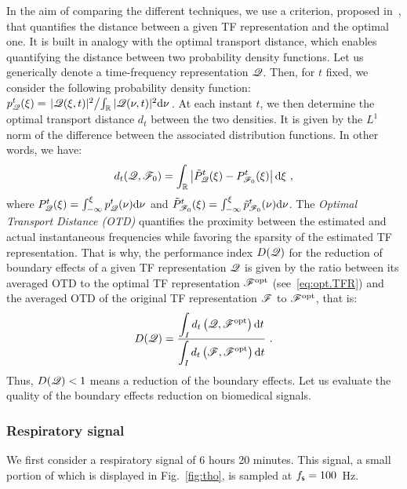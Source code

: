 In the aim of comparing the different techniques, we use a criterion, proposed in~\cite{Daubechies16conceft}, that quantifies the distance between a given TF representation and the optimal one. It is built in analogy with the optimal transport distance, which enables quantifying the distance between two probability density functions. Let us generically denote a time-frequency representation ${\mathscr Q}$. Then, for $t$ fixed, we consider the following probability density function: $p_{\mathscr Q}^t(\xi) = \left. |{\mathscr Q}(\xi,t)|^2 \middle/ \int_{\mathbb R} |{\mathscr Q}(\nu,t)|^2\mathrm{d}\nu \right.$. At each instant $t$, we then determine the optimal transport distance $d_{t}$ between the two densities. It is given by the $L^1$ norm of the difference between the associated distribution functions. In other words, we have:
\begin{equation*}
d_{t}(\ccQ,\ccF_0) = \int_\RR\left|\tilde P_{\ccQ}^t(\xi)-  P_{\ccF_0}^t(\xi)\right|\dd\xi\ ,
\end{equation*}
where $P_{{\mathscr Q}}^t(\xi)=\int_{-\infty}^\xi p_{{\mathscr Q}}^t(\nu)\mathrm{d}\nu$ and $\tilde P_{{\mathscr F}_0}^t(\xi)=\int_{-\infty}^\xi\tilde p_{{\mathscr F}_0}^t(\nu)\mathrm{d}\nu$. The \textit{Optimal Transport Distance (OTD)} quantifies the proximity between the estimated and actual instantaneous frequencies while favoring the sparsity of the estimated TF representation. That is why, the performance index $D({\mathscr Q})$ for the reduction of boundary effects of a given TF representation ${\mathscr Q}$ is given by the ratio between its averaged OTD to the optimal TF representation ${\mathscr F}^\mathrm{opt}$ (see~\eqref{eq:opt.TFR}) and the averaged OTD of the original TF representation ${\mathscr F}$ to ${\mathscr F}^\mathrm{opt}$, that is:
\begin{equation}
D(\ccQ) = \dfrac{\displaystyle\int_I d_{t}\left(\ccQ,\ccF^\mathrm{opt}\right)\dd t}{\displaystyle\int_I d_{t}\left(\ccF,\ccF^\mathrm{opt}\right)\dd t}\ .
\label{eq:index.perf}
\end{equation}
Thus, $D({\mathscr Q})<1$ means a reduction of the boundary effects. Let us evaluate the quality of the boundary effects reduction on biomedical signals.


\subsubsection{Respiratory signal}
We first consider a respiratory signal of 6 hours 20 minutes. This signal, a small portion of which is displayed in Fig.~\ref{fig:tho}, is sampled at $f_{\mathsf s}=100$~Hz.

